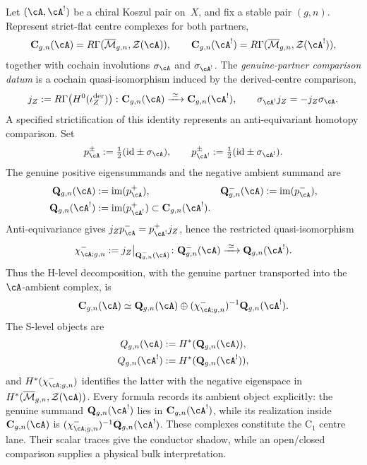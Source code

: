 \begin{definition}
\label{def:complementarity-complexes}
Let $(\cA, \cA^!)$ be a chiral Koszul pair on~$X$, and fix a stable
pair \((g,n)\).  Represent strict-flat centre complexes for both
partners,
\[
 \mathbf C_{g,n}(\cA)
 =R\Gamma(\overline{\mathcal M}_{g,n},\mathcal Z(\cA)),
 \qquad
 \mathbf C_{g,n}(\cA^!)
 =R\Gamma(\overline{\mathcal M}_{g,n},\mathcal Z(\cA^!)),
\]
together with cochain involutions \(\sigma_{\cA}\) and
\(\sigma_{\cA^!}\).  The \emph{genuine-partner comparison datum} is
a cochain quasi-isomorphism induced by the derived-centre comparison,
\[
 j_Z:=R\Gamma\!\left(H^0(\iota_Z^{\mathrm{der}})\right)
 \colon \mathbf C_{g,n}(\cA)\xrightarrow{\;\simeq\;}
 \mathbf C_{g,n}(\cA^!),
 \qquad
 \sigma_{\cA^!}j_Z=-j_Z\sigma_{\cA}.
\]
A specified strictification of this identity represents an
anti-equivariant homotopy comparison.  Set
\[
 p_{\cA}^{\pm}:=\tfrac12(\mathrm{id}\pm\sigma_{\cA}),
 \qquad
 p_{\cA^!}^{\pm}:=\tfrac12(\mathrm{id}\pm\sigma_{\cA^!}).
\]
The genuine positive eigensummands and the negative ambient summand are
\begin{align}
 \mathbf Q_{g,n}(\cA)&:=\operatorname{im}(p_{\cA}^{+}),&
 \mathbf Q_{g,n}^{-}(\cA)&:=\operatorname{im}(p_{\cA}^{-}),\\
 \mathbf Q_{g,n}(\cA^!)&:=\operatorname{im}(p_{\cA^!}^{+})
 \subset \mathbf C_{g,n}(\cA^!).
\end{align}
Anti-equivariance gives
\(j_Zp_{\cA}^{-}=p_{\cA^!}^{+}j_Z\), hence the restricted
quasi-isomorphism
\begin{equation}\label{eq:genuine-partner-minus-comparison}
 \chi^-_{\cA;g,n}:=
 j_Z\big|_{\mathbf Q^-_{g,n}(\cA)}
 \colon \mathbf Q^-_{g,n}(\cA)
 \xrightarrow{\;\simeq\;}\mathbf Q_{g,n}(\cA^!).
\end{equation}
Thus the H-level decomposition, with the genuine partner transported
into the \(\cA\)-ambient complex, is
\begin{equation}\label{eq:complementarity-fiber}
 \mathbf C_{g,n}(\cA)
 \simeq \mathbf Q_{g,n}(\cA)\oplus
 (\chi^-_{\cA;g,n})^{-1}\mathbf Q_{g,n}(\cA^!).
\end{equation}
The S-level objects are
\begin{align}\label{eq:shadow-spaces}
 Q_{g,n}(\cA)&:=H^*(\mathbf Q_{g,n}(\cA)),\\
 Q_{g,n}(\cA^!)&:=H^*(\mathbf Q_{g,n}(\cA^!)),
\end{align}
and \(H^*(\chi^-_{\cA;g,n})\) identifies the latter with the
negative eigenspace in
\(H^*(\overline{\mathcal M}_{g,n},\mathcal Z(\cA))\).
Every formula records its ambient object explicitly: the genuine
summand \(\mathbf Q_{g,n}(\cA^!)\) lies in
\(\mathbf C_{g,n}(\cA^!)\), while its realization inside
\(\mathbf C_{g,n}(\cA)\) is
\((\chi^-_{\cA;g,n})^{-1}\mathbf Q_{g,n}(\cA^!)\).
These complexes constitute the \(\mathrm C_1\) centre lane.  Their
scalar traces give the conductor shadow, while an open/closed
comparison supplies a physical bulk interpretation.
\end{definition}

